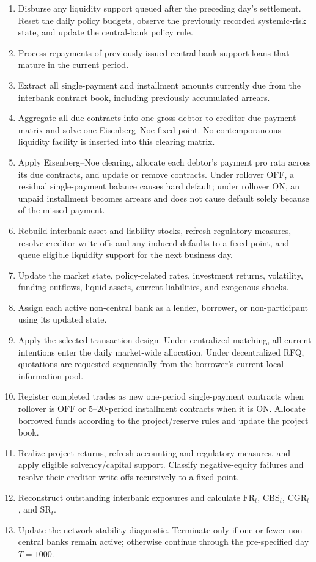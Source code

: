 \begin{enumerate}
\def\labelenumi{\arabic{enumi}.}
\item
  Disburse any liquidity support queued after the preceding day's
  settlement. Reset the daily policy budgets, observe the previously
  recorded systemic-risk state, and update the central-bank policy rule.
\item
  Process repayments of previously issued central-bank support loans
  that mature in the current period.
\item
  Extract all single-payment and installment amounts currently due from
  the interbank contract book, including previously accumulated arrears.
\item
  Aggregate all due contracts into one gross debtor-to-creditor
  due-payment matrix and solve one Eisenberg--Noe fixed point. No
  contemporaneous liquidity facility is inserted into this clearing
  matrix.
\item
  Apply Eisenberg--Noe clearing, allocate each debtor's payment pro rata
  across its due contracts, and update or remove contracts. Under
  rollover OFF, a residual single-payment balance causes hard default;
  under rollover ON, an unpaid installment becomes arrears and does not
  cause default solely because of the missed payment.
\item
  Rebuild interbank asset and liability stocks, refresh regulatory
  measures, resolve creditor write-offs and any induced defaults to a
  fixed point, and queue eligible liquidity support for the next
  business day.
\item
  Update the market state, policy-related rates, investment returns,
  volatility, funding outflows, liquid assets, current liabilities, and
  exogenous shocks.
\item
  Assign each active non-central bank as a lender, borrower, or
  non-participant using its updated state.
\item
  Apply the selected transaction design. Under centralized matching,
  all current intentions enter the daily market-wide allocation. Under
  decentralized RFQ, quotations are requested sequentially from the
  borrower's current local information pool.
\item
  Register completed trades as new one-period single-payment contracts
  when rollover is OFF or 5--20-period installment contracts when it is
  ON. Allocate borrowed funds according to the project/reserve rules and
  update the project book.
\item
  Realize project returns, refresh accounting and regulatory measures,
  and apply eligible solvency/capital support. Classify negative-equity
  failures and resolve their creditor write-offs recursively to a fixed
  point.
\item
  Reconstruct outstanding interbank exposures and calculate
  \(\mathrm{FR}_t\), \(\mathrm{CBS}_t\), \(\mathrm{CGR}_t\), and
  \(\mathrm{SR}_t\).
\item
  Update the network-stability diagnostic. Terminate only if one or
  fewer non-central banks remain active; otherwise continue through the
  pre-specified day \(T=1000\).
\end{enumerate}

